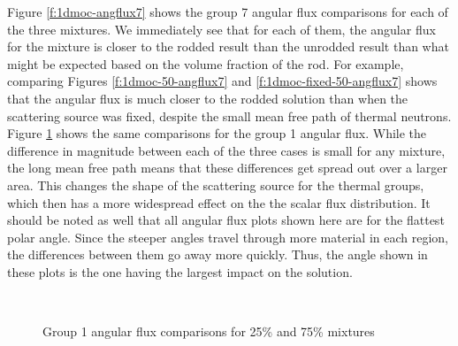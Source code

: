 Figure \ref{f:1dmoc-angflux7} shows the group 7 angular flux comparisons for each of the three mixtures.  We immediately see that for each of them, the angular flux for the mixture is closer to the rodded result than the unrodded result than what might be expected based on the volume fraction of the rod.  For example, comparing Figures \ref{f:1dmoc-50-angflux7} and \ref{f:1dmoc-fixed-50-angflux7} shows that the angular flux is much closer to the rodded solution than when the scattering source was fixed, despite the small mean free path of thermal neutrons.  Figure \ref{f:1dmoc-angflux1} shows the same comparisons for the group 1 angular flux.  While the difference in magnitude between each of the three cases is small for any mixture, the long mean free path means that these differences get spread out over a larger area.  This changes the shape of the scattering source for the thermal groups, which then has a more widespread effect on the the scalar flux distribution.  It should be noted as well that all angular flux plots shown here are for the flattest polar angle.  Since the steeper angles travel through more material in each region, the differences between them go away more quickly.  Thus, the angle shown in these plots is the one having the largest impact on the solution.

\begin{figure}[h]
  \centering
  ~
  ~
  \caption{Group 1 angular flux comparisons for 25\% and 75\% mixtures}\label{f:1dmoc-angflux1}
\end{figure}

